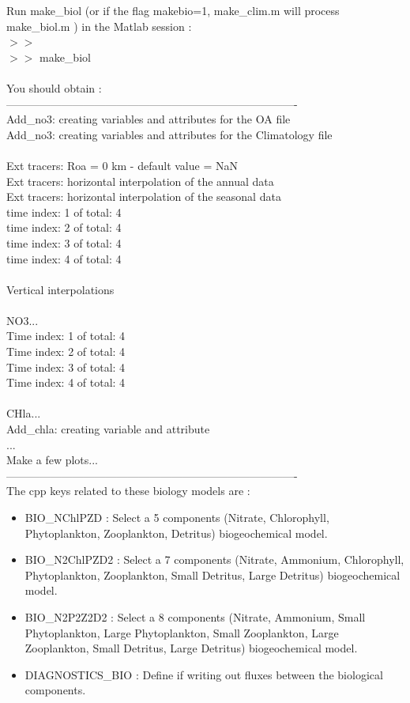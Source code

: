 Run make\_biol  (or if the flag makebio=1,  
make\_clim.m will process make\_biol.m )
in the Matlab session :\\
$>>$\\
$>>$ make\_biol\\\\
You should obtain :\\
-------------------------------------------------------------------------------\\
Add\_no3: creating variables and attributes for the OA file\\
Add\_no3: creating variables and attributes for the Climatology file\\
\\ 
 Ext tracers: Roa = 0 km - default value = NaN\\
 Ext tracers: horizontal interpolation of the annual data\\
 Ext tracers: horizontal interpolation of the seasonal data\\
time index: 1 of total: 4\\
time index: 2 of total: 4\\
time index: 3 of total: 4\\
time index: 4 of total: 4\\
 \\
 Vertical interpolations\\
 \\
 NO3...\\
 Time index: 1 of total: 4\\
 Time index: 2 of total: 4\\
 Time index: 3 of total: 4\\
 Time index: 4 of total: 4\\
 \\
 CHla...\\
Add\_chla: creating variable and attribute\\
...\\
Make a few plots...\\
-------------------------------------------------------------------------------\\

The cpp keys related to these biology models are :
\begin{itemize}
\item BIO\_NChlPZD : Select a 5 components (Nitrate, Chlorophyll, Phytoplankton, 
Zooplankton, Detritus) biogeochemical model.
\item BIO\_N2ChlPZD2 : Select a 7 components (Nitrate, Ammonium, Chlorophyll, 
Phytoplankton, Zooplankton, Small Detritus, Large Detritus) biogeochemical model. 
\item BIO\_N2P2Z2D2 : Select a 8 components (Nitrate, Ammonium, Small  
Phytoplankton, Large Phytoplankton, Small Zooplankton, Large Zooplankton,
Small Detritus, Large Detritus) biogeochemical model. 
\item DIAGNOSTICS\_BIO : Define if writing out fluxes between the biological
components.\\
\end{itemize}

